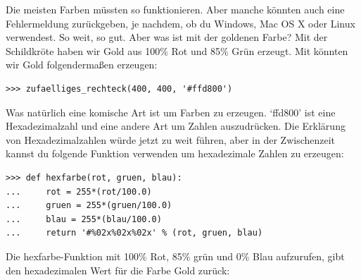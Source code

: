 Die meisten Farben müssten so funktionieren. Aber manche könnten auch eine Fehlermeldung zurückgeben, je nachdem, ob du Windows, Mac OS X oder Linux verwendest. So weit, so gut. Aber was ist mit der goldenen Farbe? Mit der Schildkröte haben wir Gold aus 100\% Rot und 85\% Grün erzeugt. Mit  könnten wir Gold folgendermaßen erzeugen:

\begin{Verbatim}[frame=single]
>>> zufaelliges_rechteck(400, 400, '#ffd800')
\end{Verbatim}

Was natürlich eine komische Art ist um Farben zu erzeugen. `ffd800' ist eine Hexadezimalzahl und eine andere Art um Zahlen auszudrücken. Die Erklärung von Hexadezimalzahlen würde jetzt zu weit führen, aber in der Zwischenzeit kannst du folgende Funktion verwenden um hexadezimale Zahlen zu erzeugen:

\begin{Verbatim}[frame=single]
>>> def hexfarbe(rot, gruen, blau):
...     rot = 255*(rot/100.0)
...     gruen = 255*(gruen/100.0)
...     blau = 255*(blau/100.0)
...     return '#%02x%02x%02x' % (rot, gruen, blau)
\end{Verbatim}

Die hexfarbe-Funktion mit 100\% Rot, 85\% grün und 0\% Blau aufzurufen, gibt den hexadezimalen Wert für die Farbe Gold zurück:

